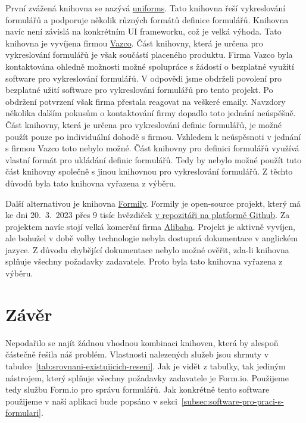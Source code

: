 První zvážená knihovna se nazývá \href{https://uniforms.tools/}{uniforms}.
Tato knihovna řeší vykreslování formulářů a podporuje několik různých formátů definice formulářů.
Knihovna navíc není závislá na konkrétním UI frameworku, což je velká výhoda.
Tato knihovna je vyvíjena firmou \href{https://www.vazco.eu/}{Vazco}.
Část knihovny, která je určena pro vykreslování formulářů je však součástí placeného produktu.
Firma Vazco byla kontaktována ohledně možnosti možné spolupráce s žádostí o bezplatné využití software pro vykreslování formulářů.
V odpovědi jsme obdrželi povolení pro bezplatné užití software pro vykreslování formulářů pro tento projekt.
Po obdržení potvrzení však firma přestala reagovat na veškeré emaily.
Navzdory několika dalším pokusům o kontaktování firmy dopadlo toto jednání neúspěšně.
Část knihovny, která je určena pro vykreslování definic formulářů, je možné použít pouze po individuální dohodě s firmou.
Vzhledem k neúspěsnoti v jednání s firmou Vazco toto nebylo možné.
Část knihovny pro definici formulářů využívá vlastní formát pro ukládání definic formulářů.
Tedy by nebylo možné použít tuto část knihovny společně s jinou knihovnou pro vykreslování formulářů.
Z těchto důvodů byla tato knihovna vyřazena z výběru.

Další alternativou je knihovna \href{https://formilyjs.org/}{Formily}.
Formily je open-source projekt, který má ke dni 20.\ 3.\ 2023 přes 9 tisíc hvězdiček \href{https://github.com/alibaba/formily}{v repozitáři na platformě Github}.
Za projektem navíc stojí velká komerční firma \href{https://www.alibaba.com/}{Alibaba}.
Projekt je aktivně vyvíjen, ale bohužel v době volby technologie nebyla dostupná dokumentace v anglickém jazyce.
Z důvodu chybějící dokumentace nebylo možné ověřit, zda-li knihovna splňuje všechny požadavky zadavatele.
Proto byla tato knihovna vyřazena z výběru.

\section*{Závěr}\label{sec:zaver-analyzy-existujicich-reseni}

Nepodařilo se najít žádnou vhodnou kombinaci knihoven, která by alespoň částečně řešila náš problém.
Vlastnosti nalezených služeb jsou shrnuty v tabulce~\ref{tab:srovnani-existujicich-reseni}.
Jak je vidět z tabulky, tak jediným nástrojem, který splňuje všechny požadavky zadavatele je Form.io.
Použijeme tedy službu Form.io pro správu formulářů.
Jak konkrétně tento software použijeme v naší aplikaci bude popsáno v sekci~\ref{subsec:software-pro-praci-s-formulari}.


